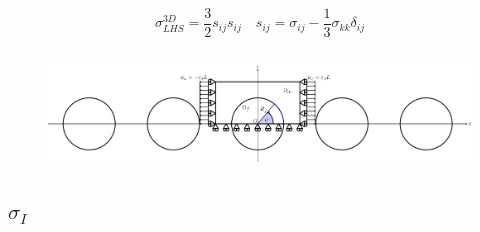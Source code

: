 \documentclass[first,firstsupp,lastsupp,last,hyperref,table]{ETHclass}
\begin{document}
\begin{frame}
\begin{columns}[c]
\begin{column}{0.5\textwidth}
\begin{figure}
\end{figure}
\vspace{-0.3cm}
\scriptsize
\begin{equation*}
\sigma^{3D}_{LHS}=\frac{3}{2}s_{ij}s_{ij}\quad s_{ij}=\sigma_{ij}-\frac{1}{3}\sigma_{kk}\delta_{ij}
\end{equation*}
\end{column}
\end{columns}
\vspace{-0.3cm}
\centering
\begin{figure}
\centering
\includegraphics[width=\textwidth]{refAngle.pdf}
\end{figure}
\end{frame}

\subsection{$\sigma_{I}$}
\end{document}
